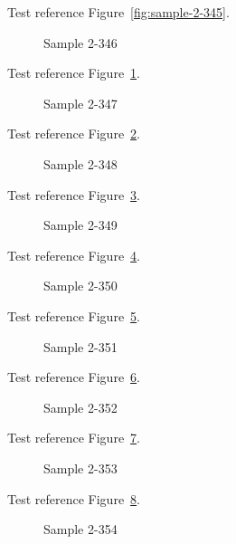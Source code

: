 Test reference Figure~\ref{fig:sample-2-345}.

\begin{figure}[tbhp]
\caption{Sample 2-346}
\label{fig:sample-2-346}
\end{figure}

Test reference Figure~\ref{fig:sample-2-346}.

\begin{figure}[tbhp]
\caption{Sample 2-347}
\label{fig:sample-2-347}
\end{figure}

Test reference Figure~\ref{fig:sample-2-347}.

\begin{figure}[tbhp]
\caption{Sample 2-348}
\label{fig:sample-2-348}
\end{figure}

Test reference Figure~\ref{fig:sample-2-348}.

\begin{figure}[tbhp]
\caption{Sample 2-349}
\label{fig:sample-2-349}
\end{figure}

Test reference Figure~\ref{fig:sample-2-349}.

\begin{figure}[tbhp]
\caption{Sample 2-350}
\label{fig:sample-2-350}
\end{figure}

Test reference Figure~\ref{fig:sample-2-350}.

\begin{figure}[tbhp]
\caption{Sample 2-351}
\label{fig:sample-2-351}
\end{figure}

Test reference Figure~\ref{fig:sample-2-351}.

\begin{figure}[tbhp]
\caption{Sample 2-352}
\label{fig:sample-2-352}
\end{figure}

Test reference Figure~\ref{fig:sample-2-352}.

\begin{figure}[tbhp]
\caption{Sample 2-353}
\label{fig:sample-2-353}
\end{figure}

Test reference Figure~\ref{fig:sample-2-353}.

\begin{figure}[tbhp]
\caption{Sample 2-354}
\label{fig:sample-2-354}
\end{figure}

